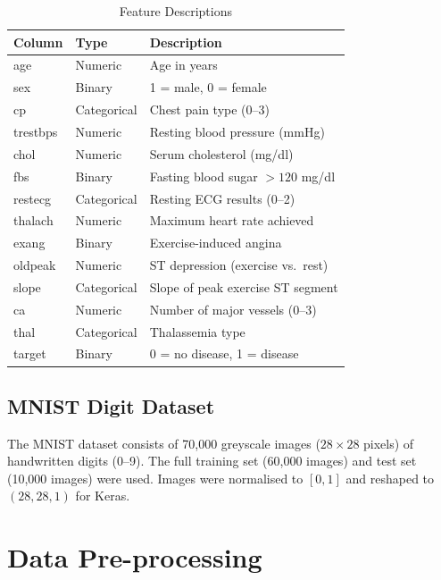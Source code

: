 \documentclass[12pt,a4paper]{article}
\begin{document}
\begin{table}[H]
\centering
\caption{Feature Descriptions}
\begin{tabular}{llp{8cm}}
\toprule
\textbf{Column} & \textbf{Type} & \textbf{Description} \\
\midrule
age       & Numeric        & Age in years \\
sex       & Binary         & 1 = male, 0 = female \\
cp        & Categorical    & Chest pain type (0--3) \\
trestbps  & Numeric        & Resting blood pressure (mmHg) \\
chol      & Numeric        & Serum cholesterol (mg/dl) \\
fbs       & Binary         & Fasting blood sugar $>120$ mg/dl \\
restecg   & Categorical    & Resting ECG results (0--2) \\
thalach   & Numeric        & Maximum heart rate achieved \\
exang     & Binary         & Exercise-induced angina \\
oldpeak   & Numeric        & ST depression (exercise vs.\ rest) \\
slope     & Categorical    & Slope of peak exercise ST segment \\
ca        & Numeric        & Number of major vessels (0--3) \\
thal      & Categorical    & Thalassemia type \\
target    & Binary         & 0 = no disease, 1 = disease \\
\bottomrule
\end{tabular}
\end{table}

\subsection{MNIST Digit Dataset}

The MNIST dataset consists of 70,000 greyscale images ($28\times28$ pixels) of handwritten digits (0--9). The full training set (60,000 images) and test set (10,000 images) were used. Images were normalised to $[0,1]$ and reshaped to $(28,28,1)$ for Keras.

\section{Data Pre-processing}
\end{document}
